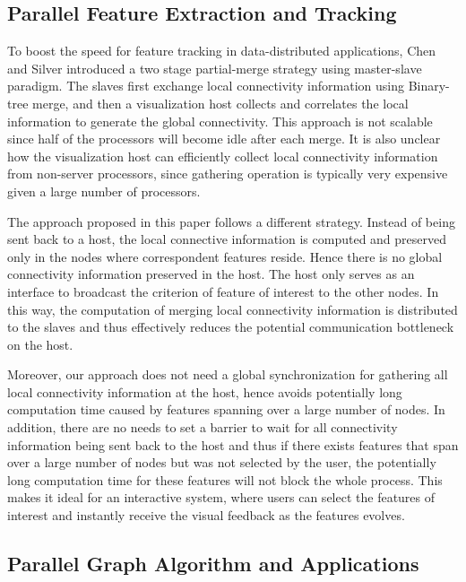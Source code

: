 \documentclass[10pt, conference, compsocconf]{IEEEtran}
\begin{document}
\subsection{Parallel Feature Extraction and Tracking}

To boost the speed for feature tracking in data-distributed applications, Chen and Silver \cite{Chen2003} introduced a two stage partial-merge strategy using master-slave paradigm. The slaves first exchange local connectivity information using Binary-tree merge, and then a visualization host collects and correlates the local information to generate the global connectivity. This approach is not scalable since half of the processors will become idle after each merge. It is also unclear how the visualization host can efficiently collect local connectivity information from non-server processors, since gathering operation is typically very expensive given a large number of processors.

The approach proposed in this paper follows a different strategy. Instead of being sent back to a host, the local connective information is computed and preserved only in the nodes where correspondent features reside. Hence there is no global connectivity information preserved in the host. The host only serves as an interface to broadcast the criterion of feature of interest to the other nodes. In this way, the computation of merging local connectivity information is distributed to the slaves and thus effectively reduces the potential communication bottleneck on the host.

Moreover, our approach does not need a global synchronization for gathering all local connectivity information at the host, hence avoids potentially long computation time caused by features spanning over a large number of nodes. In addition, there are no needs to set a barrier to wait for all connectivity information being sent back to the host and thus if there exists features that span over a large number of nodes but was not selected by the user, the potentially long computation time for these features will not block the whole process. This makes it ideal for an interactive system, where users can select the features of interest and instantly receive the visual feedback as the features evolves.

\subsection{Parallel Graph Algorithm and Applications}
\end{document}
